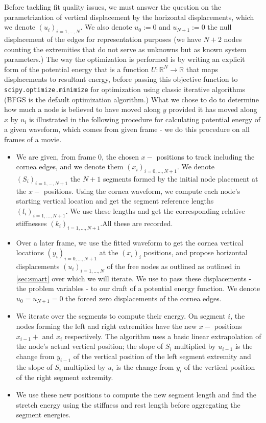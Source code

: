 \documentclass[epjST]{svjour}
\begin{document}
Before tackling fit quality issues, we must answer the question on the parametrization of vertical displacement by the horizontal displacements, which we denote $(u_i)_{i = 1,...,N}$. We also denote $u_0:=0$ and $u_{N+1}:= 0$ the null displacement of the edges for representation purposes (we have $N+2$ nodes counting the extremities that do not serve as unknowns but as known system parameters.) The way the optimization is performed is by writing an explicit form of the potential energy that is a function $U:\mathbb{R}^N\to \mathbb{R}$ that maps displacements to resultant energy, before passing this objective function to \texttt{scipy.optimize.minimize} for optimization using classic iterative algorithms (BFGS is the default optimization algorithm.) What we chose to do to determine how much a node is believed to have moved along $y$ provided it has moved along $x$ by $u_i$ is illustrated in the following procedure for calculating potential energy of a given waveform, which comes from given frame - we do this procedure on all frames of a movie.
\begin{itemize}
    \item We are given, from frame 0, the chosen $x-$ positions to track including the cornea edges, and we denote them $(x_i)_{i=0,...,N+1}$. We denote $(S_i)_{i=1,...,N+1}$ the $N+1$ segments formed by the initial node placement at the $x-$ positions. Using the cornea waveform, we compute each node's starting vertical location and get the segment reference lengths $(l_i)_{i=1,...,N+1}$. We use these lengths and get the corresponding relative stiffnesses $(k_i)_{i=1,...,N+1}$.All these are recorded.
    \\\item Over a later frame, we use the fitted waveform to get the cornea vertical locations $(y_i)_{i=0,...,N+1}$ at the $(x_i)_i$ positions, and propose horizontal displacements $(u_i)_{i=1,...,N}$ of the free nodes as outlined as outlined in \autoref{sec:smart} over which we will iterate. We use to pass these displacements - the problem variables - to our draft of a potential energy function. We denote $u_0 = u_{N+1} = 0$ the forced zero displacements of the cornea edges.
    \\\item We iterate over the segments to compute their energy. On segment $i$, the nodes forming the left and right extremities have the new $x-$ positions $x_{i-1} + $ and $x_i$ respectively. The algorithm uses a basic linear extrapolation of the node's actual vertical position; the slope of $S_i$ multiplied by $u_{i-1}$ is the change from $y_{i-1}$ of the vertical position of the left segment extremity and the slope of $S_i$ multiplied by $u_{i}$ is the change from $y_{i}$ of the vertical position of the right segment extremity.
    \\\item We use these new positions to compute the new segment length and find the stretch energy using the stiffness and rest length before aggregating the segment energies.
\end{itemize}
\end{document}
